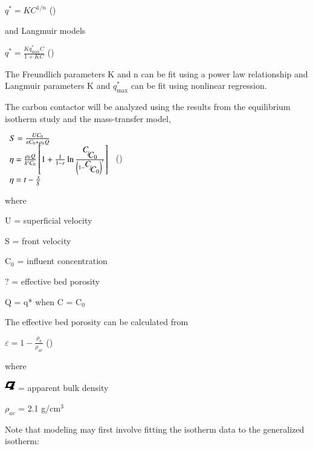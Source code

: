 \documentclass{article} %
\begin{document}
 $q^{*} =KC^{1/n} $ (\label{1})

\noindent 

\noindent and Langmuir models

 $q^{*} =\frac{Kq_{\max }^{*} C}{1+KC} $ (\label{2})

\noindent The Freundlich parameters K and n can be fit using a power law relationship and Langmuir parameters K and $q_{\max }^{*} $ can be fit using nonlinear regression.

The carbon contactor will be analyzed using the results from the equilibrium isotherm study and the mass-transfer model,

 $\begin{array}{l} {S=\frac{UC_{0} }{\varepsilon C_{0} +\rho _{b} Q} } \\ {\eta =\frac{\rho _{b} Q}{k'C_{0} } \left[1+\frac{1}{1- r} \ln \frac{{\raise0.7ex\hbox{$ C $}\!\mathord{\left/ {\vphantom {C C_{0} }} \right. \kern-\nulldelimiterspace}\!\lower0.7ex\hbox{$ C_{0}  $}} }{\left(1- {\raise0.7ex\hbox{$ C $}\!\mathord{\left/ {\vphantom {C C_{0} }} \right. \kern-\nulldelimiterspace}\!\lower0.7ex\hbox{$ C_{0}  $}} \right)^{r} } \right]} \\ {\eta =t- \frac{x}{S} } \end{array}$ (\label{3})

\noindent where 

\noindent U =  superficial velocity

\noindent S = front velocity

\noindent C${}_{0}$ = influent concentration

\noindent ? = effective bed porosity

\noindent Q = q* when C = C${}_{0}$

The effective bed porosity can be calculated from

 $\varepsilon =1-\frac{\rho _{b} }{\rho _{ac} } $ (\label{4})

\noindent where 

\noindent \includegraphics*[width=0.18in, height=0.19in, keepaspectratio=false]{image1} =  apparent bulk density

\noindent $\rho _{ac} $ =  2.1 g/cm${}^{3}$

\noindent 

Note that modeling may first involve fitting the isotherm data to the generalized isotherm:
\end{document}
